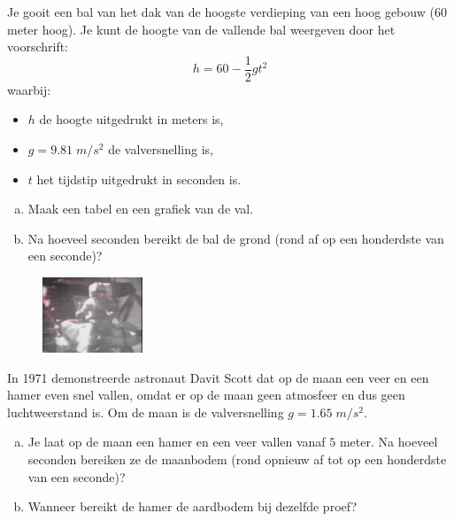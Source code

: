 \documentclass[12pt]{article}
\begin{document}
\begin{oefening}
Je gooit een bal van het dak van de hoogste verdieping van een hoog gebouw ($60$ meter hoog). Je kunt de hoogte van de vallende bal weergeven door het voorschrift:
$$h=60-\frac{1}{2}gt^2$$
waarbij:
\begin{itemize}
  \item $h$ de hoogte uitgedrukt in meters is,
  \item $g=9.81 \;m/s^2$ de valversnelling is,
  \item $t$ het tijdstip uitgedrukt in seconden is.
\end{itemize}
\begin{enumerate}[(a)]
  \item Maak een tabel en een grafiek van de val.
  \item Na hoeveel seconden bereikt de bal de grond (rond af op een honderdste van een seconde)?
\end{enumerate}
\end{oefening}

\begin{oefening}

\begin{figure}
\vspace*{-0.6cm}
\begin{center}
  \includegraphics[width=3cm]{davidscott}
\end{center}
\end{figure}

In 1971 demonstreerde astronaut Davit Scott dat op de maan een veer en een hamer even snel vallen, omdat er op de maan geen atmosfeer en dus geen luchtweerstand is. Om de maan is de valversnelling $g=1.65 \;m/s^2$.\\

\begin{enumerate}[(a)]
  \item Je laat op de maan een hamer en een veer vallen vanaf $5$ meter. Na hoeveel seconden bereiken ze de maanbodem (rond opnieuw af tot op een honderdste van een seconde)?
  \item Wanneer bereikt de hamer de aardbodem bij dezelfde proef?
\end{enumerate}
\end{oefening}
\end{document}
